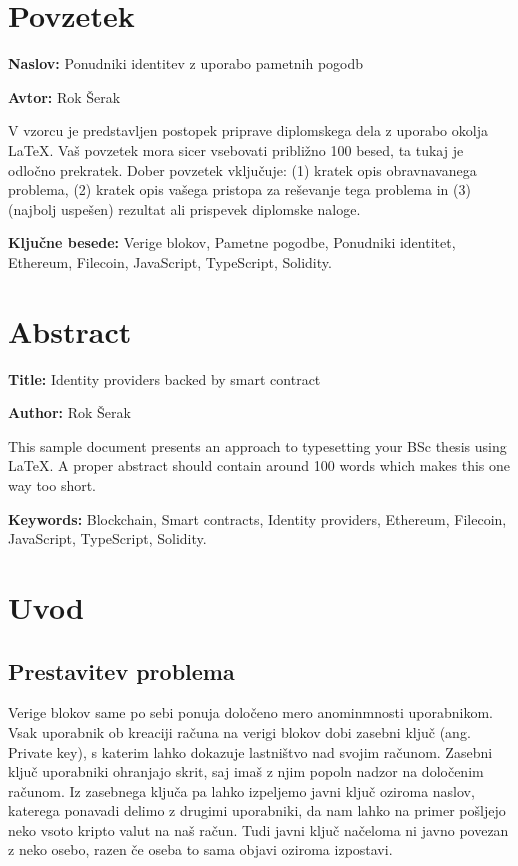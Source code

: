 \documentclass[a4paper,12pt,openright]{book}
\newcommand{\ttitle}{Ponudniki identitev z uporabo pametnih pogodb}
\newcommand{\ttitleEn}{Identity providers backed by smart contract}
\newcommand{\tauthor}{Rok Šerak}
\newcommand{\tkeywords}{Verige blokov, Pametne pogodbe, Ponudniki identitet, Ethereum, Filecoin, JavaScript, TypeScript, Solidity}
\newcommand{\tkeywordsEn}{Blockchain, Smart contracts, Identity providers, Ethereum, Filecoin, JavaScript, TypeScript, Solidity}
\newcommand{\clearemptydoublepage}{\newpage{\pagestyle{empty}\cleardoublepage}}
\begin{document}
\clearemptydoublepage

\chapter*{Povzetek}

\noindent\textbf{Naslov:} \ttitle
\bigskip

\noindent\textbf{Avtor:} \tauthor
\bigskip

\noindent V vzorcu je predstavljen postopek priprave diplomskega dela z uporabo okolja \LaTeX. Vaš povzetek mora sicer vsebovati približno 100 besed, ta tukaj je odločno prekratek.
Dober povzetek vključuje: (1) kratek opis obravnavanega problema, (2) kratek opis vašega pristopa za reševanje tega problema in (3) (najbolj uspešen) rezultat ali prispevek diplomske naloge.

\bigskip

\noindent\textbf{Ključne besede:} \tkeywords.
\clearemptydoublepage

\chapter*{Abstract}

\noindent\textbf{Title:} \ttitleEn
\bigskip

\noindent\textbf{Author:} \tauthor
\bigskip

\noindent This sample document presents an approach to typesetting your BSc thesis using \LaTeX. 
A proper abstract should contain around 100 words which makes this one way too short.
\bigskip

\noindent\textbf{Keywords:} \tkeywordsEn.
\clearemptydoublepage

\mainmatter
\setcounter{page}{1}
\pagestyle{fancy}

\chapter{Uvod}

\section{Prestavitev problema}
Verige blokov same po sebi ponuja določeno mero anominmnosti uporabnikom.
Vsak uporabnik ob kreaciji računa na verigi blokov dobi zasebni ključ (ang. Private key), s katerim lahko dokazuje lastništvo nad svojim računom.
Zasebni ključ uporabniki ohranjajo skrit, saj imaš z njim popoln nadzor na določenim računom.
Iz zasebnega ključa pa lahko izpeljemo javni ključ oziroma naslov, katerega ponavadi delimo z drugimi uporabniki, 
da nam lahko na primer pošljejo neko vsoto kripto valut na naš račun.
Tudi javni ključ načeloma ni javno povezan z neko osebo, razen če oseba to sama objavi oziroma izpostavi.
\end{document}
